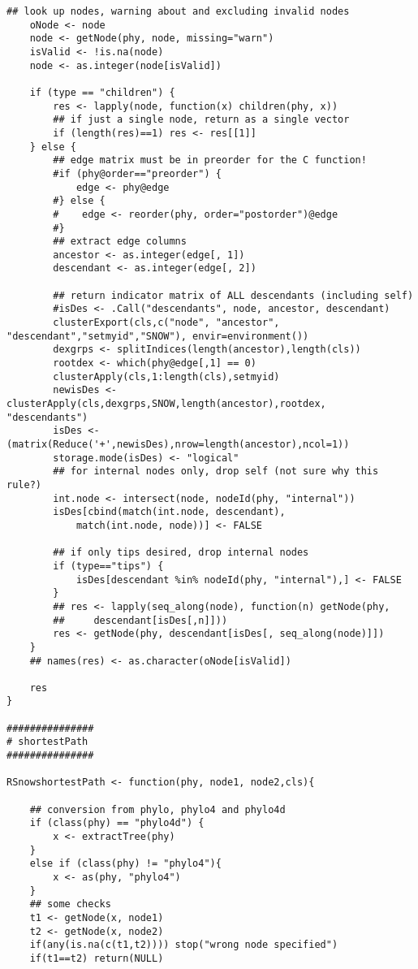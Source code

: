\documentclass[11pt,letterpaper]{article}
\begin{document}
\begin{lstlisting}[style=MyR]
    ## look up nodes, warning about and excluding invalid nodes
    oNode <- node
    node <- getNode(phy, node, missing="warn")
    isValid <- !is.na(node)
    node <- as.integer(node[isValid])

    if (type == "children") {
        res <- lapply(node, function(x) children(phy, x))
        ## if just a single node, return as a single vector
        if (length(res)==1) res <- res[[1]]
    } else {
        ## edge matrix must be in preorder for the C function!
        #if (phy@order=="preorder") {
            edge <- phy@edge
        #} else {
        #    edge <- reorder(phy, order="postorder")@edge
        #}
        ## extract edge columns
        ancestor <- as.integer(edge[, 1])
        descendant <- as.integer(edge[, 2])

        ## return indicator matrix of ALL descendants (including self)
        #isDes <- .Call("descendants", node, ancestor, descendant)
        clusterExport(cls,c("node", "ancestor", "descendant","setmyid","SNOW"), envir=environment())
        dexgrps <- splitIndices(length(ancestor),length(cls))
        rootdex <- which(phy@edge[,1] == 0)
        clusterApply(cls,1:length(cls),setmyid)
        newisDes <- clusterApply(cls,dexgrps,SNOW,length(ancestor),rootdex,     "descendants")
        isDes <- (matrix(Reduce('+',newisDes),nrow=length(ancestor),ncol=1))
        storage.mode(isDes) <- "logical"
        ## for internal nodes only, drop self (not sure why this rule?)
        int.node <- intersect(node, nodeId(phy, "internal"))
        isDes[cbind(match(int.node, descendant),
            match(int.node, node))] <- FALSE

        ## if only tips desired, drop internal nodes
        if (type=="tips") {
            isDes[descendant %in% nodeId(phy, "internal"),] <- FALSE
        }
        ## res <- lapply(seq_along(node), function(n) getNode(phy,
        ##     descendant[isDes[,n]]))
        res <- getNode(phy, descendant[isDes[, seq_along(node)]])
    }
    ## names(res) <- as.character(oNode[isValid])

    res
}

###############
# shortestPath
###############

RSnowshortestPath <- function(phy, node1, node2,cls){

    ## conversion from phylo, phylo4 and phylo4d
    if (class(phy) == "phylo4d") {
        x <- extractTree(phy)
    }
    else if (class(phy) != "phylo4"){
        x <- as(phy, "phylo4")
    }
    ## some checks
    t1 <- getNode(x, node1)
    t2 <- getNode(x, node2)
    if(any(is.na(c(t1,t2)))) stop("wrong node specified")
    if(t1==t2) return(NULL)


\end{lstlisting}
\end{document}
